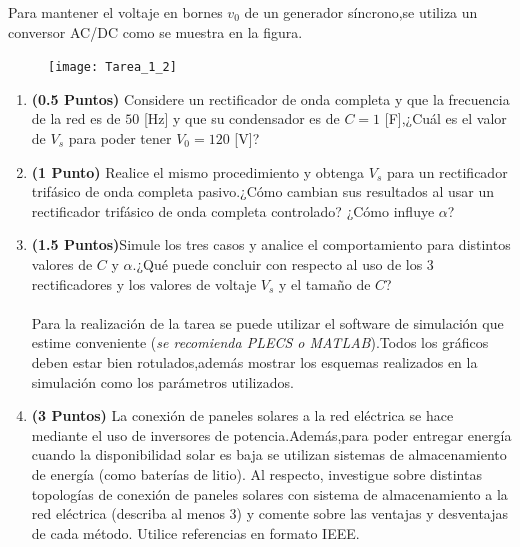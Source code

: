 \documentclass[
  11pt,
  letterpaper,
   addpoints,
   answers
  ]{exam}
\begin{document}
\begin{questions}
    \question Para mantener el voltaje en bornes $v_{0}$ de un generador síncrono,se utiliza un conversor AC/DC como se muestra en la figura.
    \begin{figure}[h!]
        \centering
        \texttt{[image: Tarea\_1\_2]}
    \end{figure}
    \begin{enumerate}[label=\alph*)]
        \item \textbf{(0.5 Puntos)} Considere un rectificador de onda completa y que la frecuencia de la red es de $50$ [Hz] y que su condensador es de $C = 1$ [F],¿Cuál es el valor de $V_{s}$ para poder tener $V_{0} = 120$ [V]?
        \item \textbf{(1 Punto)} Realice el mismo procedimiento y obtenga $V_{s}$ para un rectificador trifásico de onda completa pasivo.¿Cómo cambian sus resultados al usar un rectificador trifásico de onda completa controlado? ¿Cómo influye $\alpha$?
        \item \textbf{(1.5 Puntos)}Simule los tres casos y analice el comportamiento para distintos valores de $C$ y $\alpha$.¿Qué puede concluir con respecto al uso de los 3 rectificadores y los valores de voltaje $V_{s}$ y el tamaño de $C$?\\\\
        Para la realización de la tarea se puede utilizar el software de simulación que estime conveniente (\textit{se recomienda PLECS o MATLAB}).Todos los gráficos deben estar bien rotulados,además mostrar los esquemas realizados en la simulación como los parámetros utilizados.
        \item \textbf{(3 Puntos)} La conexión de paneles solares a la red eléctrica se hace mediante el uso de inversores de potencia.Además,para poder entregar energía cuando la disponibilidad solar es baja se utilizan sistemas de almacenamiento de energía (como baterías de litio). Al respecto, investigue sobre distintas topologías de conexión de paneles solares con sistema de almacenamiento a la red eléctrica (describa al menos 3) y comente sobre las ventajas y desventajas de cada método. Utilice referencias en formato IEEE.
    \end{enumerate}
\end{questions}
\end{document}
